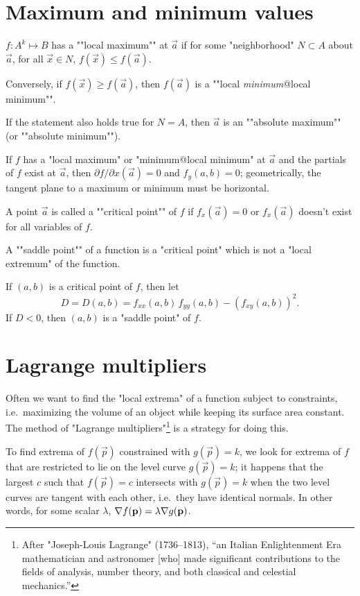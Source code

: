 \documentclass[knowledge]{rbt-mathnotes}
\begin{document}
\section{Maximum and minimum values}
\begin{defn}
  $f : A^k \mapsto B$ has a ""local maximum"" at $\vec a$ if for some
  "neighborhood" $N \subset A$ about $\vec a$, for all $\vec x \in N$,
  $f(\vec x) \le f(\vec a)$.

  Conversely, if $f(\vec x) \ge f(\vec a)$, then $f(\vec a)$ is a ""local
  \emph{minimum}@local minimum"".

  If the statement also holds true for $N = A$, then $\vec a$ is an
  ""absolute maximum"" (or ""absolute minimum"").
\end{defn}

If $f$ has a "local maximum" or "minimum@local minimum" at $\vec a$ and the
partials of $f$ exist at $\vec a$, then $\partial f/\partial x (\vec a) = 0$
and $f_y(a, b) = 0$; geometrically, the tangent plane to a maximum or
minimum must be horizontal.

\begin{defn}
  A point $\vec a$ is called a ""critical point"" of $f$ if $f_x(\vec a) =
  0$ or $f_x(\vec a)$ doesn't exist for all variables of $f$.
\end{defn}

\begin{defn}
  A ""saddle point"" of a function is a "critical point" which is not a
  "local extremum" of the function.
\end{defn}

If $(a, b)$ is a critical point of $f$, then let
\[D = D(a, b) = f_{xx} (a,b) \, f_{yy} (a,b) - (f_{xy}(a,b))^2.\]
If $D < 0$, then $(a, b)$ is a "saddle point" of $f$.

\section{Lagrange multipliers}
Often we want to find the "local extrema" of a function subject to
constraints, i.e.~maximizing the volume of an object while keeping its
surface area constant. The method of "Lagrange multipliers"\footnote{After
"Joseph-Louis Lagrange" (1736--1813), ``an Italian Enlightenment Era
mathematician and astronomer [who] made significant contributions to the
fields of analysis, number theory, and both classical and celestial
mechanics.''} is a strategy for doing this.

To find extrema of $f(\vec p)$ constrained with $g(\vec p) = k$,
we look for extrema of $f$ that are restricted to lie on the level curve
$g(\vec p) = k$; it happens that the largest $c$ such that $f(\vec p) = c$
intersects with  $g(\vec p) = k$ when the two level curves are tangent with
each other, i.e.~they have identical normals. In other words, for some
scalar $\lambda$, $\nabla f(\mathbf{p}) = \lambda \nabla g(\mathbf{p})$.
\end{document}
